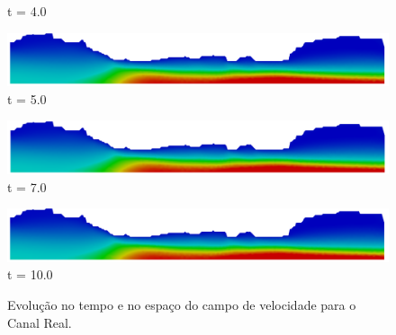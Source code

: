 \begin{figure}[H]
\begin{minipage}{.50\linewidth}
      t = 4.0
     \end{minipage}%
     \begin{minipage}{.50\linewidth}
      \centering
      \includegraphics[scale=0.12]{./02_chaps/cap_solution/figure/vel_Real10000.png}\\
      t = 5.0
     \end{minipage}
     \begin{minipage}{.50\linewidth}
     \medskip
      \centering
      \includegraphics[scale=0.12]{./02_chaps/cap_solution/figure/vel_Real14000.png}\\
      t = 7.0
     \end{minipage}%
     \begin{minipage}{.50\linewidth}
     \medskip
      \centering
      \includegraphics[scale=0.12]{./02_chaps/cap_solution/figure/vel_Real20000.png}\\
      t = 10.0
     \end{minipage}
     \medskip
     \caption{Evolução no tempo e no espaço do campo de velocidade para o Canal Real.}
     \label{velocity field real}
\end{figure}

\newpage
